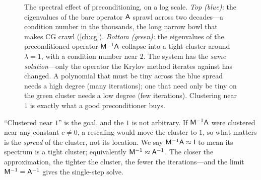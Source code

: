 \begin{figure}[t]
\centering
{}
\caption[Preconditioning clusters the spectrum]{The spectral effect of preconditioning,
on a log scale. \emph{Top (blue):} the eigenvalues of the bare operator $\mathsf{A}$ sprawl
across two decades---a condition number in the thousands, the long narrow bowl that makes
CG crawl (\cref{ch:cg}). \emph{Bottom (green):} the eigenvalues of the preconditioned
operator $\mathsf{M}^{-1}\mathsf{A}$ collapse into a tight cluster around $\lambda=1$, with a
condition number near $2$. The system has the \emph{same solution}---only the operator
the Krylov method iterates against has changed. A polynomial that must be tiny across the
blue spread needs a high degree (many iterations); one that need only be tiny on the
green cluster needs a low degree (few iterations). Clustering near $1$ is exactly what a
good preconditioner buys.}
\label{fig:spectrum}
\end{figure}

\begin{notationbox}
``Clustered near $1$'' is the goal, and the $1$ is not arbitrary. If $\mathsf{M}^{-1}\mathsf{A}$
were clustered near any constant $c\neq0$, a rescaling would move the cluster to $1$, so
what matters is the \emph{spread} of the cluster, not its location. We say
$\mathsf{M}^{-1}\mathsf{A}\approx\mathsf{I}$ to mean its spectrum is a tight cluster; equivalently
$\mathsf{M}^{-1}\approx\mathsf{A}^{-1}$. The closer the approximation, the tighter the cluster,
the fewer the iterations---and the limit $\mathsf{M}^{-1}=\mathsf{A}^{-1}$ gives the single-step
solve.
\end{notationbox}

